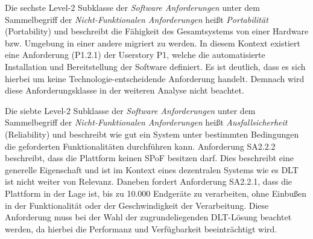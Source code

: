 Die sechste Level-2 Subklasse der \textit{Software Anforderungen} unter dem Sammelbegriff der \textit{Nicht-Funktionalen Anforderungen} heißt \textit{Portabilität} (Portability) und beschreibt die Fähigkeit des Gesamtsystems von einer Hardware bzw. Umgebung in einer andere migriert zu werden. In diesem Kontext existiert eine Anforderung (P1.2.1) der Userstory P1, welche die automatisierte Installation und Bereitstellung der Software definiert. Es ist deutlich, dass es sich hierbei um keine Technologie-entscheidende Anforderung handelt. Demnach wird diese Anforderungsklasse in der weiteren Analyse nicht beachtet.


Die siebte Level-2 Subklasse der \textit{Software Anforderungen} unter dem Sammelbegriff der \textit{Nicht-Funktionalen Anforderungen} heißt \textit{Ausfallsicherheit} (Reliability) und beschreibt wie gut ein System unter bestimmten Bedingungen die geforderten Funktionalitäten durchführen kann. Anforderung SA2.2.2 beschreibt, dass die Plattform keinen \ac{SPoF} besitzen darf. Dies beschreibt eine generelle Eigenschaft und ist im Kontext eines dezentralen Systems wie es \ac{DLT} ist nicht weiter von Relevanz. Daneben fordert Anforderung SA2.2.1, dass die Plattform in der Lage ist, bis zu 10.000 Endgeräte zu verarbeiten, ohne Einbußen in der Funktionalität oder der Geschwindigkeit der Verarbeitung. Diese Anforderung muss bei der Wahl der zugrundeliegenden \ac{DLT}-Lösung beachtet werden, da hierbei die Performanz und Verfügbarkeit beeinträchtigt wird.


